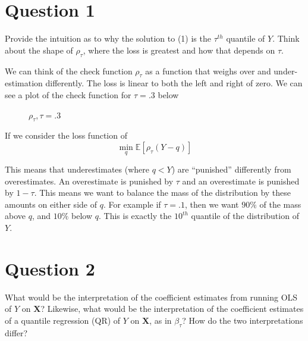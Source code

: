 \documentclass[12pt]{paper}
\newcommand{\exV}[1]{\mathbb{E} \left [ #1 \right ]}
\begin{document}
\section*{Question 1}
Provide the intuition as to why the solution to (1) is the $\tau^{th}$
quantile of $Y$. Think about the shape of $\rho_{\tau}$, where the loss is
greatest and how that depends on $\tau$.
\vspace{.3in}

We can think of the check function $\rho_{\tau}$ as a function that weighs
over and under-estimation differently. The loss
is linear to both the left and right of zero. We can see a plot of the
check function for $\tau= .3$ below

\begin{figure}[H]
  \centering
      \caption{$\rho_{\tau}, \tau = .3$} 

\end{figure}

If we consider the loss function of
\begin{equation*}
  \min_q \exV{ \rho_{\tau}( Y - q)}
\end{equation*}

This means that underestimates (where $q < Y$) are ``punished''
differently from overestimates. An overestimate is punished by $\tau$ and
an overestimate is punished by $1-\tau$. This means we want to balance
the mass of the distribution by these amounts on either side of
$q$. For example if $\tau = .1$, then we want $90\%$ of the mass above $q$,
and $10\%$ below $q$. This is exactly the $10^{th}$ quantile of the
distribution of $Y$.

\section*{Question 2}

What would be the interpretation of the coefficient estimates from
running OLS of $Y$ on $\bm{X}$? Likewise, what would be the
interpretation of the coefficient estimates of a quantile regression
(QR) of $Y$ on $\bm{X}$, as in $\beta_{\tau}$? How do the two interpretations
differ?
\end{document}
